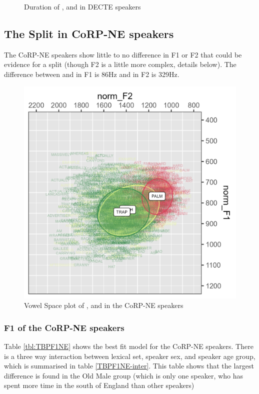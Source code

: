 \documentclass[../../../00.FullDoc/tex/ThesisSkeleton-draft2]{subfiles}
\begin{document}
\begin{figure}[h]
	
	\caption{Duration of \trap{}, \bath{} and \palm{}  in DECTE speakers} \label{fig:TBdurDE}
\end{figure}

\subsection{The Split in CoRP-NE speakers}
The CoRP-NE speakers show little to no difference in F1 or F2 that could be evidence for a \TB{} split (though F2 is a little more complex, details below). The difference between \trap{} and \palm{} in F1 is 86Hz and in F2 is 329Hz.

\begin{figure}[h]
	\includegraphics[width=\textwidth]{../figures/TBP-NE-vplot.png}
	\caption{Vowel Space plot of \trap{},\bath{} and \palm{} in the CoRP-NE speakers} \label{fig:TBPvplotNE}
\end{figure}



\subsubsection{F1 of the CoRP-NE speakers}
Table \ref{tbl:TBPF1NE} shows the best fit model for the CoRP-NE speakers. There is a three way interaction between lexical set, speaker sex, and speaker age group, which is summarised in table \ref{TBPF1NE-inter}. This table shows that the largest \TB{} difference is found in the Old Male group (which is only one speaker, who has spent more time in the south of England than other speakers)
\end{document}
